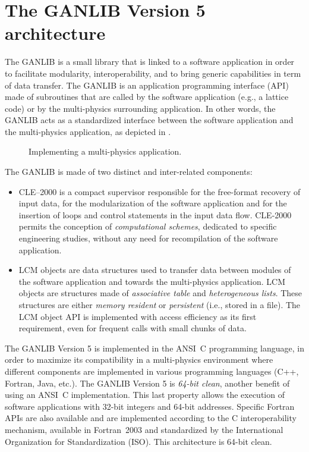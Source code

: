 \section{The GANLIB Version 5 architecture}

The GANLIB is a small library that is linked to a software application in order to facilitate modularity,
interoperability, and to bring generic capabilities in term of  data transfer. The GANLIB is an application programming
interface (API) made of subroutines that are called by the software application (e.g., a lattice code) or by
the multi-physics surrounding application. In other words, the GANLIB acts as a standardized interface between the
software application and the multi-physics application, as depicted in .

\begin{figure}[htbp]
\begin{center} 
\epsfxsize=9cm
\centerline{ }
\parbox{12cm}{\caption{Implementing a multi-physics application.}\label{fig:multi}}
\end{center}  
\end{figure}
\goodbreak

\vskip 0.08cm

The GANLIB is made of two distinct and inter-related components:
\begin{itemize}
\item CLE--2000 is a compact supervisor responsible for the free-format recovery of input data, for the modularization
of the software application and for the insertion of loops and control statements in the input data flow. CLE-2000
permits the conception of {\sl computational schemes}, dedicated to specific engineering studies, without any need
for recompilation of the software application.\cite{cle2000}
\item LCM objects are data structures used to transfer data between modules of the software application and towards the 
multi-physics application. LCM objects are structures made of {\sl associative table} and {\sl heterogeneous lists}. These
structures are either {\sl memory resident} or {\sl persistent} (i.e., stored in a file). The LCM object API is implemented
with access efficiency as its first requirement, even for frequent calls with small chunks of data.\cite{lcm2002}
\end{itemize}

\vskip 0.08cm

The GANLIB Version 5 is implemented in the ANSI~C programming language\cite{ansiC}, in order to maximize its compatibility
in a multi-physics environment where different components are implemented in various programming languages (C++,
Fortran, Java, etc.). The GANLIB Version 5 is {\sl 64-bit clean}, another benefit of using an ANSI~C implementation. This
last property allows the execution of software applications with 32-bit integers and 64-bit addresses. Specific Fortran
APIs are also available and are implemented according to the C interoperability mechanism,
available in Fortran~2003 and standardized by the International Organization for Standardization (ISO). This architecture is 64-bit clean.\cite{fortran2003}

